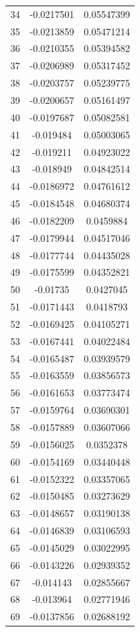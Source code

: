 \documentclass[a4paper, 11pt, oneside]{report}
\begin{document}
{\begin{longtable}{|c|c|c|}
34  & -0.0217501 & 0.05547399 \\
35  & -0.0213859 & 0.05471214 \\
36  & -0.0210355 & 0.05394582 \\
37  & -0.0206989 & 0.05317452 \\
38  & -0.0203757 & 0.05239775 \\
39  & -0.0200657 & 0.05161497 \\
40  & -0.0197687 & 0.05082581 \\
41  & -0.019484  & 0.05003065 \\
42  & -0.019211  & 0.04923022 \\
43  & -0.018949  & 0.04842514 \\
44  & -0.0186972 & 0.04761612 \\
45  & -0.0184548 & 0.04680374 \\
46  & -0.0182209 & 0.0459884  \\
47  & -0.0179944 & 0.04517046 \\
48  & -0.0177744 & 0.04435028 \\
49  & -0.0175599 & 0.04352821 \\
50  & -0.01735   & 0.0427045  \\
51  & -0.0171443 & 0.0418793  \\
52  & -0.0169425 & 0.04105271 \\
53  & -0.0167441 & 0.04022484 \\
54  & -0.0165487 & 0.03939579 \\
55  & -0.0163559 & 0.03856573 \\
56  & -0.0161653 & 0.03773474 \\
57  & -0.0159764 & 0.03690301 \\
58  & -0.0157889 & 0.03607066 \\
59  & -0.0156025 & 0.0352378  \\
60  & -0.0154169 & 0.03440448 \\
61  & -0.0152322 & 0.03357065 \\
62  & -0.0150485 & 0.03273629 \\
63  & -0.0148657 & 0.03190138 \\
64  & -0.0146839 & 0.03106593 \\
65  & -0.0145029 & 0.03022995 \\
66  & -0.0143226 & 0.02939352 \\
67  & -0.014143  & 0.02855667 \\
68  & -0.013964  & 0.02771946 \\
69  & -0.0137856 & 0.02688192 \\

\end{longtable}}
\end{document}
